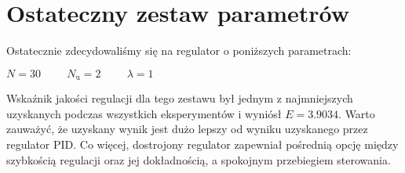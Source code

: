 \section{Ostateczny zestaw parametrów}
Ostatecznie zdecydowaliśmy się na regulator o poniższych parametrach:\\

\begin{center}
    $N = \num{30} \mathrm{\hspace{1cm}}N_{\mathrm{u}} = \num{2} \mathrm{\hspace{1cm}} \lambda = \num{1}$
\end{center}
Wskaźnik jakości regulacji dla tego zestawu był jednym z najmniejszych uzyskanych podczas wszystkich eksperymentów i wyniósł $E = \num{3,9034}$. Warto zauważyć, że uzyskany wynik jest dużo lepszy od wyniku uzyskanego przez regulator PID. Co więcej, dostrojony regulator zapewniał pośrednią opcję między szybkością regulacji oraz jej dokładnością, a spokojnym przebiegiem sterowania. 
\label{dmc_result}